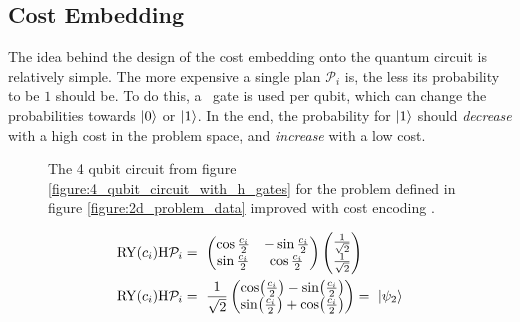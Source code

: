 \subsection{Cost Embedding}
\label{chapter:cost_embedding}

The idea behind the design of the cost embedding onto the quantum circuit is relatively simple. The more expensive a single plan $\mathcal{P}_i$ is, the less its probability to be $1$ should be. To do this, a \rygate\ gate is used per qubit, which can change the probabilities towards $\ket{0}$ or $\ket{1}$. In the end, the probability for $\ket{1}$ should \emph{decrease} with a high cost in the problem space, and \emph{increase} with a low cost.

\newpage

\begin{figure}[!h]
    \centering
    \caption{The 4 qubit circuit from figure \ref{figure:4_qubit_circuit_with_h_gates} for the problem defined in figure \ref{figure:2d_problem_data} improved with cost encoding \rygate.}
    \label{figure:4_qubit_circuit_with_h_ry_gates}
\end{figure}

\begin{equation}
    \centering
    \begin{split}
        \mathrm{RY}(c_i)\mathrm{H}\mathcal{P}_i &=\ \begin{pmatrix} \cos{\frac{c_i}{2}} & -\sin{\frac{c_i}{2}} \\ \sin{\frac{c_i}{2}} & \cos{\frac{c_i}{2}} \end{pmatrix}\begin{pmatrix}\frac{1}{\sqrt{2}} \\ \frac{1}{\sqrt{2}}\end{pmatrix}\\
        \mathrm{RY}(c_i)\mathrm{H}\mathcal{P}_i &=\ \frac{1}{\sqrt{2}}\begin{pmatrix}\cos(\frac{c_i}{2}) - \sin(\frac{c_i}{2}) \\ \sin(\frac{c_i}{2}) + \cos(\frac{c_i}{2})\end{pmatrix} =\ \ket{\psi_2}\\
    \end{split}
    \label{equation:2d_problem_state_0_1}
\end{equation}

